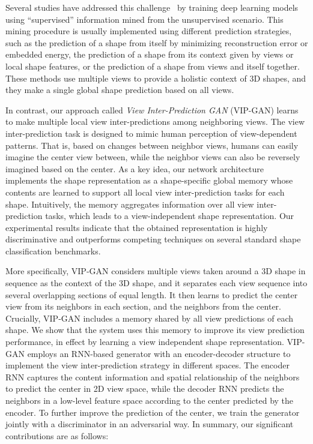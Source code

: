 \documentclass[letterpaper]{article} \usepackage{aaai19}  \usepackage{times}  \usepackage{helvet}  \usepackage{courier}  \usepackage{url}  \usepackage{graphicx}
\begin{document}
Several studies have addressed this challenge~\cite{Sharma16,WuNIPS2016,Zhizhong2016b,Girdhar16,RezendeEMBJH16,YaoqingCVPR2018,PanosCVPR2018ICML,HanTIP18} by training deep learning models using ``supervised'' information mined from the unsupervised scenario. This mining procedure is usually implemented using different prediction strategies, such as the prediction of a shape from itself by minimizing reconstruction error or embedded energy, the prediction of a shape from its context given by views or local shape features, or the prediction of a shape from views and itself together.
These methods use multiple views to provide a holistic context of 3D shapes, and they make a single global shape prediction based on all views.


In contrast, our approach called \textit{View Inter-Prediction GAN} (VIP-GAN) learns to make multiple local view inter-predictions among neighboring views. The view inter-prediction task is designed to mimic human perception of view-dependent patterns. That is, based on changes between neighbor views, humans can easily imagine the center view between, while the neighbor views can also be reversely imagined based on the center. As a key idea, our network architecture implements the shape representation as a shape-specific global memory whose contents are learned to support all local view inter-prediction tasks for each shape. Intuitively, the memory aggregates information over all view inter-prediction tasks, which leads to a view-independent shape representation. Our experimental results indicate that the obtained representation is highly discriminative and outperforms competing techniques on several standard shape classification benchmarks.





More specifically, VIP-GAN considers multiple views taken around a 3D shape in sequence as the context of the 3D shape, and it separates each view sequence into several overlapping sections of equal length. It then learns to predict the center view from its neighbors in each section, and the neighbors from the center. Crucially, VIP-GAN includes a memory shared by all view predictions of each shape. We show that the system uses this memory to improve its view prediction performance, in effect by learning a view independent shape representation. VIP-GAN employs an RNN-based generator with an encoder-decoder structure to implement the view inter-prediction strategy in different spaces. The encoder RNN captures the content information and spatial relationship of the neighbors to predict the center in 2D view space, while the decoder RNN predicts the neighbors in a low-level feature space according to the center predicted by the encoder. To further improve the prediction of the center, we train the generator jointly with a discriminator in an adversarial way.
In summary, our significant contributions are as follows:
\end{document}
